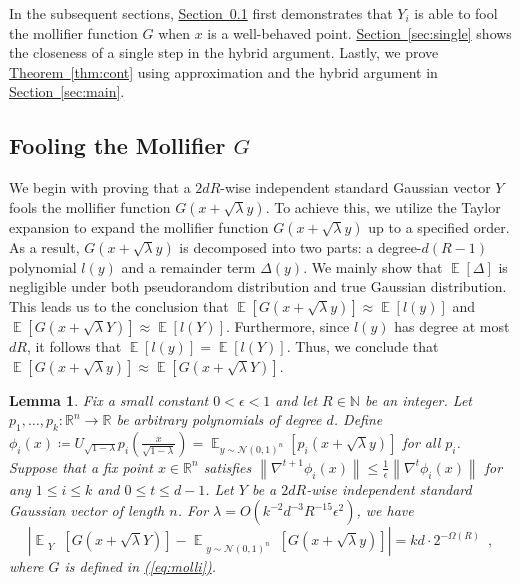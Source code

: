 \documentclass[12pt]{article}
\newtheorem{lemma}[theorem]{Lemma}
\newcommand{\eq}[1]{\hyperref[eq:#1]{(\ref*{eq:#1})}}
\newcommand{\thm}[1]{\hyperref[thm:#1]{Theorem~\ref*{thm:#1}}}
\newcommand{\sect}[1]{\hyperref[sec:#1]{Section~\ref*{sec:#1}}}
\newcommand{\N}{\mathbb{N}}  \newcommand{\R}{\mathbb{R}} \newcommand{\C}{\mathbb{C}} \newcommand{\U}{\mathbb{U}} \renewcommand{\d}{\mathrm{d}} \DeclareMathOperator*{\E}{\mathbb{E}}  \newcommand{\so}{\mathrm{SO}} \newcommand{\s}{\mathrm{S}} \newcommand{\su}{\mathrm{SU}} \renewcommand{\i}{\mathrm{i}} \newcommand{\A}{\mathcal{A}}  \newcommand{\B}{\mathcal{B}} \newcommand{\CC}{\mathcal{C}} \newcommand{\D}{\mathcal{D}} \newcommand{\F}{\mathcal{F}} \renewcommand{\H}{\mathcal{H}} \newcommand{\K}{\mathcal{K}} \newcommand{\NN}{\mathcal{N}} \newcommand{\V}{\mathcal{V}} \newcommand{\X}{\mathcal{X}} \newcommand{\Y}{\mathcal{Y}} \renewcommand{\S}{\mathcal{S}} \newcommand{\SR}{\mathcal{S}_{\R}} \newcommand{\SC}{\mathcal{S}_{\C}} \newcommand{\EE}{\mathcal{E}}  \newcommand{\PP}{\mathcal{P}} \newcommand{\KK}{\widetilde{K}} \newcommand{\LL}{\widetilde{L}} \newcommand{\W}{\widehat{W}} \newcommand{\f}{\hat{f}} \newcommand{\g}{\hat{g}} \newcommand{\h}{\hat{h}} \newcommand{\bit}[1]{\{0,1\}^{#1}} \newcommand{\wrt}{w.r.t.~} \newcommand{\us}{\overset{\$}{\leftarrow}} \newcommand{\set}[1]{\left\{#1\right\}} \newcommand{\lhs}{\mathrm{LHS}} \newcommand{\expec}[1]{\E\!\Br{#1}} \newcommand{\expect}[2]{\E_{\substack{#1}}\!\Br{#2}} \newcommand{\prob}[2]{\underset{#1}{\mathrm{Pr}}\!\Br{#2}} \newcommand{\cf}{\widetilde{f}} \newcommand{\cg}{\widetilde{g}} \newcommand{\ch}{\widetilde{h}} \newcommand{\ck}{\widetilde{K}} \newcommand{\rep}[2]{\br{#1}_{#2}} \newcommand{\AND}[1]{\mathrm{AND}\!\br{#1}}
\newcommand{\grad}[2]{\nabla^{#1}{#2}}
\newcommand{\br}[1]{\left(#1\right)} \newcommand{\Br}[1]{\left[#1\right]} \newcommand{\st}[1]{\left\{#1\right\}} \newcommand{\tr}[1]{\mathrm{Tr}\!\Br{#1}} \newcommand{\abs}[1]{\left|#1 \right|} \newcommand{\norm}[1]{\left\lVert #1 \right\rVert} \newcommand{\agl}[2]{\theta^{\br{#1}}_{#2}} \newcommand{\aglp}[2]{{\theta'}^{\br{#1}}_{#2}} \newcommand{\lint}[1]{\left\lfloor#1\right\rfloor} \newcommand{\poly}[1]{\mathrm{poly}\!\br{#1}} \newcommand{\negl}[1]{\mathrm{negl}\!\br{#1}} \newcommand{\de}[1]{\mathrm{d}#1} \newcommand{\val}[1]{\mathrm{val}\!\br{#1}} \newcommand{\vall}[1]{\mathrm{val}\br{#1}} \newcommand{\nd}[1]{\mathcal{N}\!\br{#1}} \newcommand{\ketbratwo}[2]{\ket{#1} \hspace{-0.4em}\bra{#2}} \newcommand{\ketbra}[1]{\ketbratwo{#1}{#1}} \newcommand{\id}{\ensuremath{\mathds{1}}} \newcommand{\ogroup}[1]{\mathrm{O}\!\br{#1}} \newcommand{\ugroup}[1]{\mathrm{U}\!\br{#1}} \newcommand{\td}{\mathrm{TD}} \newcommand{\tv}[1]{\norm{#1}_{\mathrm{TV}}} \newcommand {\defeq} {\ensuremath{ \stackrel{\mathrm{def}}{=} }} \newcommand{\vdim}{\ensuremath{N}} \newcommand{\dimin}{\ensuremath{n}} \newcommand{\dimout}{\ensuremath{m}} \newcommand{\ncopy}{\ell} \newcommand{\hspacein}{\H_\mathrm{in}} \newcommand{\hspaceout}{\H_\mathrm{out}} \newcommand{\Sin}{\S(\hspacein)} \newcommand{\Sout}{\S(\hspaceout)} \newcommand{\haar}{\ensuremath{\mu}} \newcommand{\tensorhaar}{\ensuremath{\eta}} \newcommand{\tensorsrss}{\ensuremath{\nu}} \newcommand{\qadvice}{\ensuremath{\rho}} \newcommand{\tp}{\otimes} \newcommand{\wone}[2]{W_1\!\br{#1,#2}}
\begin{document}
	In the subsequent sections, \sect{molli} first demonstrates that $Y_i$ is able to fool the mollifier function $G$ when $x$ is a well-behaved point.
	\sect{single} shows the closeness of a single step in the hybrid argument.
	Lastly, we prove \thm{cont} using approximation and the hybrid argument in \sect{main}.
	





\subsection{Fooling the Mollifier $G$} \label{sec:molli}
We begin with proving that a $2dR$-wise independent standard Gaussian vector $Y$
fools the mollifier function $G(x+\sqrt{\lambda}y)$.
To achieve this, we utilize the Taylor expansion to expand
the mollifier function
$G(x+\sqrt{\lambda}y)$ up to a specified order.
As a result, $G(x+\sqrt{\lambda}y)$ is decomposed into two parts:
a degree-$d(R-1)$ polynomial $l(y)$ and a remainder term $\Delta(y)$.
We mainly show that $\E[\Delta]$ is negligible under both
pseudorandom distribution and true Gaussian distribution.
This leads us to the conclusion that
$\E[G(x+\sqrt{\lambda}y)]\approx \E[l(y)]$ and
$\E[G(x+\sqrt{\lambda}Y)]\approx \E[l(Y)]$.
Furthermore, since $l(y)$ has degree at most $dR$,
it follows that $\E[l(y)] = \E[l(Y)]$.
Thus, we conclude that $\E[G(x+\sqrt{\lambda}y)]\approx\E[G(x+\sqrt{\lambda}Y)]$.


\begin{lemma}\label{lem:molli}
		Fix a small constant $0<\epsilon<1$ and let $R\in\N$ be an integer.
		Let $p_1,\dots,p_k:\R^n \to \R$ be arbitrary polynomials of degree $d$.
	Define $\phi_i(x) \coloneq U_{\sqrt{1-\lambda}} p_i\!\br{\frac{x}{\sqrt{1-\lambda}}}=\E_{y\sim\NN\br{0,1}^n}[p_i(x+\sqrt{\lambda}y)]$ for all $p_i$.
Suppose that a fix point $x\in\R^n$ satisfies $ \norm{\grad{t+1}{\phi_i(x)}} \leq \frac{1}{\epsilon}\norm{\grad{t}{\phi_i(x)}}$ for any $1\leq i\leq k$ and $0\leq t\leq d-1$.
	Let $Y$ be a $2dR$-wise independent standard Gaussian vector of length $n$.
	For $\lambda = O(k^{-2}d^{-3}R^{-15}\epsilon^2)$, we have 
	\[
	\abs{
		\expect{Y}{
			G(x+\sqrt{\lambda}Y)
		}
		-
		\expect{y\sim\NN\br{0,1}^n}{
			G(x+\sqrt{\lambda}y)
		}
	} = kd\cdot 2^{-\Omega(R)} \enspace ,
	\]
	where $G$ is defined in \eq{molli}.
	\end{lemma}
	
\end{document}
